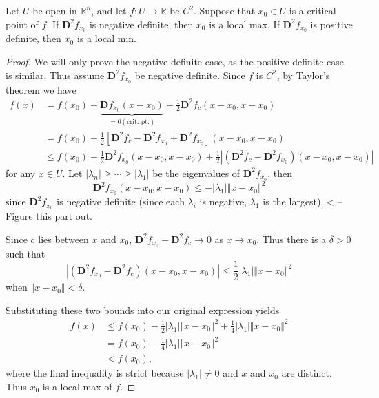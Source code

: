 \documentclass[10pt]{report}
\begin{document}
\begin{thrm}{}{}
Let $U$ be open in $\mathbb{R}^n$, and let $f:U \to \mathbb{R}$ be $C^2$. Suppose that $x_0 \in U$ is a critical point of $f$. If $\mathbf{D}^2f_{x_0}$ is negative definite, then $x_0$ is a local max. If $\mathbf{D}^2f_{x_0}$ is positive definite, then $x_0$ is a local min.
\end{thrm}
\begin{proof}
	We will only prove the negative definite case, as the positive definite case is similar. Thus assume $\mathbf{D}^2 f_{x_0}$ be negative definite. Since $f$ is $C^2$, by Taylor's theorem we have
	\begin{align*}
		f(x) &= f(x_0) + \underbrace{\mathbf{D}f_{x_0}(x-x_0)}_{= 0 (\text{crit. pt.})} + \frac{1}{2} \mathbf{D}^2f_{c}(x-x_0, x-x_0) \\
		     &= f(x_0) + \frac{1}{2} \left[ \mathbf{D}^2f_{c} - \mathbf{D}^2f_{x_0} + \mathbf{D}^2f_{x_0} \right](x-x_0, x-x_0) \\
		     &\leq f(x_0) + \frac{1}{2} \mathbf{D}^2f_{x_0} (x-x_0, x-x_0) + \frac{1}{2} \left| (\mathbf{D}^2f_{c}-\mathbf{D}^2f_{x_0})(x-x_0, x-x_0) \right|
	\end{align*}
for any $x \in U$. Let $|\lambda_n| \geq \cdots \geq |\lambda_1|$ be the eigenvalues of $\mathbf{D}^2f_{x_0}$, then
\[
	\mathbf{D}^2f_{x_0}(x-x_0, x-x_0) \leq - |\lambda_1| \Vert{x-x_0}\Vert^2
\] since $\mathbf{D}^2f_{x_0}$ is negative definite (since each $\lambda_i$ is negative, $\lambda_1$ is the largest). {\color{red}< -- Figure this part out.}

Since $c$ lies between $x$ and $x_0$, $\mathbf{D}^2f_{x_0}-\mathbf{D}^2f_{c} \to 0$ as $x \to x_0$. Thus there is a $\delta>0$ such that
\[
	| (\mathbf{D}^2f_{x_0}-\mathbf{D}^2f_{c})(x-x_0, x-x_0) | \leq \frac{1}{2} |\lambda_1| \Vert{x-x_0}\Vert^2
\] when $\Vert{x-x_0}\Vert < \delta$.

Substituting these two bounds into our original expression yields
\begin{align*}
	f(x) &\leq f(x_0) - \frac{1}{2} |\lambda_1| \Vert{x-x_0}\Vert^2 + \frac{1}{4} |\lambda_1| \Vert{x-x_0}\Vert^2 \\
	     &= f(x_0) - \frac{1}{4} |\lambda_1| \Vert{x-x_0}\Vert^2 \\
	     &< f(x_0),
\end{align*}
where the final inequality is strict because $|\lambda_1| \neq 0$ and $x$ and $ x_0$ are distinct. Thus $x_0$ is a local max of $f$.
\end{proof}
\end{document}
